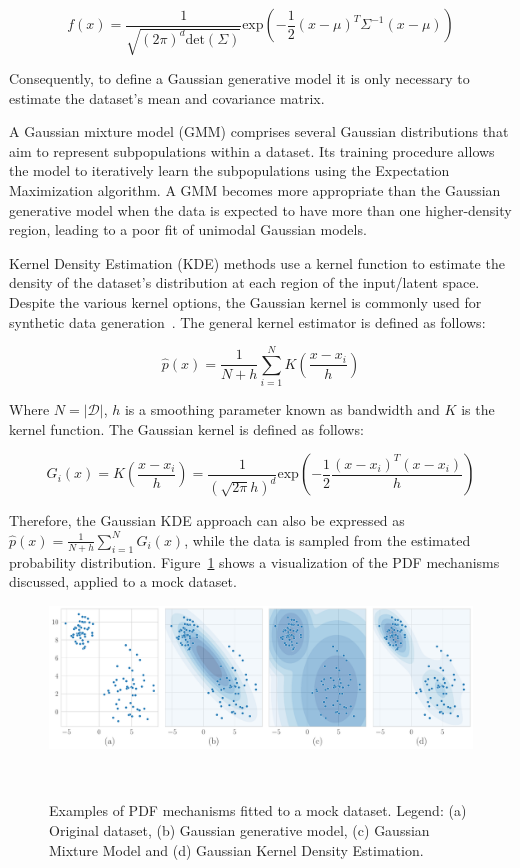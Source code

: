 \begin{equation}\label{eq:gaussian}
    f(x) =
    \frac{1}{\sqrt{(2\pi)^d\text{det}(\Sigma)}}\text{exp}\left(-\frac{1}{2}(x-\mu)^T\Sigma^{-1}(x-\mu)\right)
\end{equation}

Consequently, to define a Gaussian generative model it is only necessary to
estimate the dataset's mean and covariance matrix.

A Gaussian mixture model (GMM) comprises several Gaussian distributions that
aim to represent subpopulations within a dataset. Its training procedure
allows the model to iteratively learn the subpopulations using the Expectation
Maximization algorithm. A GMM becomes more appropriate than the Gaussian
generative model when the data is expected to have more than one
higher-density region, leading to a poor fit of unimodal Gaussian models.

Kernel Density Estimation (KDE) methods use a kernel function to estimate the
density of the dataset's distribution at each region of the input/latent
space. Despite the various kernel options, the Gaussian kernel is commonly
used for synthetic data generation~\cite{tang2015kerneladasyn}. The general
kernel estimator is defined as follows: 

\begin{equation}
    \hat{p}(x) = \frac{1}{N+h}
    \sum_{i=1}^{N}K\left(\frac{x-x_i}{h}\right)
\end{equation}

Where $N = |\mathcal{D}|$, $h$ is a smoothing parameter known as bandwidth and
$K$ is the kernel function. The Gaussian kernel is defined as follows:

\begin{equation}
    G_i(x) = K\left(\frac{x-x_i}{h} \right) = \frac{1}{(\sqrt{2\pi} h)^d} 
    \text{exp}\left(-\frac{1}{2}\frac{(x-x_i)^T(x-x_i)}{h}\right) 
\end{equation}

Therefore, the Gaussian KDE approach can also be expressed as $\hat{p}(x) =
\frac{1}{N+h}\sum_{i=1}^{N}G_i(x)$, while the data is sampled from the
estimated probability distribution. Figure~\ref{fig:pdf-example} shows a
visualization of the PDF mechanisms discussed, applied to a mock dataset.

\begin{figure}
	\centering
	\includegraphics[width=.95\linewidth]{../analysis/pdf-example}
    \caption{%
        Examples of PDF mechanisms fitted to a mock dataset. Legend: (a)
        Original dataset, (b) Gaussian generative model, (c) Gaussian Mixture
        Model and (d) Gaussian Kernel Density Estimation.
    }~\label{fig:pdf-example}
\end{figure}

